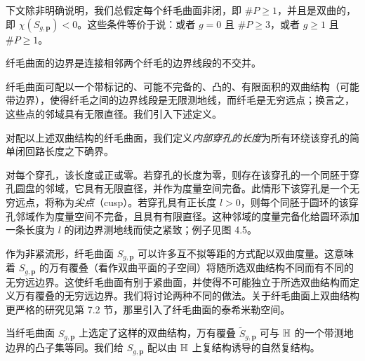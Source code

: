 下文除非明确说明，我们总假定每个纤毛曲面非闭，即 $\#P\ge 1$，并且是双曲的，即 $\chi(S_{g,\mathbf p})<0$。这些条件等价于说：或者 $g=0$ 且 $\#P\ge 3$，或者 $g\ge 1$ 且 $\#P\ge 1$。

\begin{remark}[4.8]
纤毛曲面的边界是连接相邻两个纤毛的边界线段的不交并。
\end{remark}

纤毛曲面可配以一个带标记的、可能不完备的、凸的、有限面积的双曲结构（可能带边界），使得纤毛之间的边界线段是无限测地线，而纤毛是无穷远点；换言之，这些点的邻域具有无限直径。我们引入下述定义。

\begin{definition}[4.9]
对配以上述双曲结构的纤毛曲面，我们定义\emph{内部穿孔的长度}为所有环绕该穿孔的简单闭回路长度之下确界。
\end{definition}

对每个穿孔，该长度或正或零。若穿孔的长度为零，则存在该穿孔的一个同胚于穿孔圆盘的邻域，它具有无限直径，并作为度量空间完备。此情形下该穿孔是一个无穷远点，将称为\emph{尖点}（cusp）。若穿孔具有正长度 $l>0$，则每个同胚于圆环的该穿孔邻域作为度量空间不完备，且具有有限直径。这种邻域的度量完备化给圆环添加一条长度为 $l$ 的闭边界测地线而使之紧致；例子见图 4.5。


作为非紧流形，纤毛曲面 $S_{g,\mathbf p}$ 可以许多互不拟等距的方式配以双曲度量。这意味着 $S_{g,\mathbf p}$ 的万有覆叠（看作双曲平面的子空间）将随所选双曲结构不同而有不同的无穷远边界。这使纤毛曲面有别于紧曲面，并使得不可能独立于所选双曲结构而定义万有覆叠的无穷远边界。我们将讨论两种不同的做法。关于纤毛曲面上双曲结构更严格的研究见第 7.2 节，那里引入了纤毛曲面的泰希米勒空间。

\begin{remark}[4.10]
当纤毛曲面 $S_{g,\mathbf p}$ 上选定了这样的双曲结构，万有覆叠 $\widetilde{S}_{g,\mathbf p}$ 可与 $\mathbb{H}$ 的一个带测地边界的凸子集等同。我们给 $S_{g,\mathbf p}$ 配以由 $\mathbb{H}$ 上复结构诱导的自然复结构。
\end{remark}

